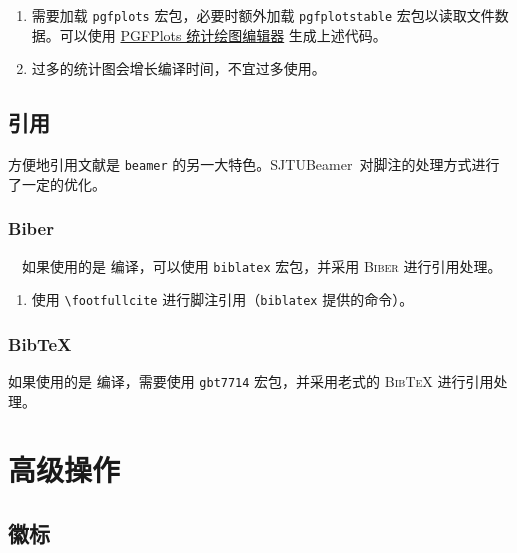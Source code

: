 \documentclass[
    UTF8,
    heading=true,
    12pt,
    a4paper
]{ctexrep}
\def\themename{\textsf{SJTUBeamer}}
\begin{document}

    \begin{enumerate}\small
        \item 需要加载 \texttt{pgfplots} 宏包，必要时额外加载 \texttt{pgfplotstable} 宏包以读取文件数据。可以使用 \href{https://logcreative.github.io/PGFPlotsEdt/}{PGFPlots 统计绘图编辑器} 生成上述代码。
        \item[\faWarning] 过多的统计图会增长编译时间，不宜过多使用。
    \end{enumerate}


    \chapter{引用}

    方便地引用文献是 \texttt{beamer} 的另一大特色。\themename\ 对脚注的处理方式进行了一定的优化。

    \section{Biber}

    \faApple\ \faLinux\ 如果使用的是  编译，可以使用 \texttt{biblatex} 宏包，并采用 \textsc{Biber} 进行引用处理。


    \begin{enumerate}\small
        \item 使用 \texttt{\textbackslash{}footfullcite} 进行脚注引用（\texttt{biblatex} 提供的命令）。
    \end{enumerate}

    \section{Bib\TeX{}}

    \faWindows 如果使用的是  编译，需要使用 \texttt{gbt7714} 宏包，并采用老式的 \textsc{Bib\TeX{}} 进行引用处理。

    \part{高级操作}
    \chapter{徽标}
\end{document}
